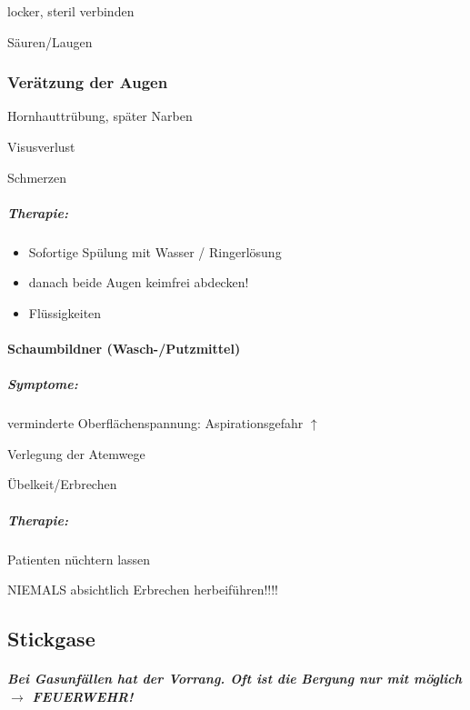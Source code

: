 {\mdseries
locker, steril verbinden}

{\mdseries
Säuren/Laugen}

\subsubsection{Verätzung der Augen}
{\mdseries
Hornhauttr\"ubung, später Narben}

{\mdseries
Visusverlust}

{\mdseries
Schmerzen}



\begin{gMassnahmenEnv}
\subparagraph*{
Therapie:}

\begin{itemize}
\item {\mdseries\color[rgb]{0.0,0.0,0.5019608}
Sofortige Sp\"ulung mit Wasser / Ringerlösung}

\item {\mdseries\color[rgb]{0.0,0.0,0.5019608}
danach beide Augen keimfrei abdecken!}

\item {\mdseries\color[rgb]{0.0,0.0,0.5019608}
Fl\"ussigkeiten}

\end{itemize}
\end{gMassnahmenEnv}


\paragraph[Schaumbildner (Wasch-/Putzmittel)]{Schaumbildner
(Wasch-/Putzmittel)}
\subparagraph*{
Symptome:}

{\mdseries
verminderte Oberflächenspannung:  Aspirationsgefahr ${\uparrow}$}

{\mdseries
Verlegung der Atemwege}

{\mdseries
\"Ubelkeit/Erbrechen}

\subparagraph*{
Therapie:}

{\mdseries
Patienten n\"uchtern lassen}

{\mdseries
NIEMALS absichtlich Erbrechen  herbeif\"uhren!!!!}





\subsection{Stickgase}

\subparagraph*{
Bei Gasunfällen hat der  Vorrang.
Oft ist die Bergung nur mit  möglich ${\rightarrow}$ FEUERWEHR!}

